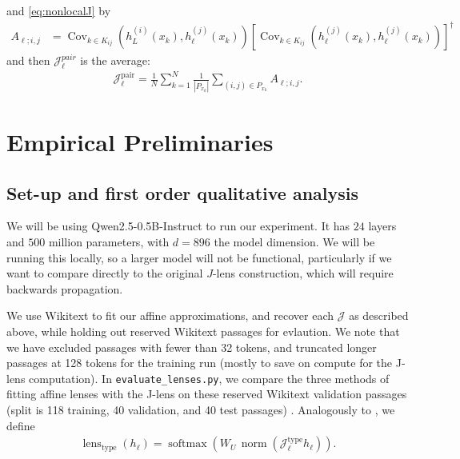 \documentclass[10pt,oneside,reqno]{amsart}
\theoremstyle{definition}
\numberwithin{equation}{section}
\newcommand{\cJ}{{\mathcal{J}}}
\begin{document}
and \eqref{eq:nonlocalJ} by 
\begin{align*}
A_{\ell;i,j}
&=
\operatorname{Cov}_{k\in K_{ij}}
\left(h_L^{(i)}(x_k),h_\ell^{(j)}(x_k)\right)
\left[
\operatorname{Cov}_{k\in K_{ij}}
\left(h_\ell^{(j)}(x_k),h_\ell^{(j)}(x_k)\right)
\right]^\dagger
\end{align*}
and then $\cJ_\ell^{pair}$ is the average:
\begin{align*}
\mathcal J_\ell^{\mathrm{pair}}
=
\frac1N\sum_{k=1}^N
\frac1{|P_{x_k}|}
\sum_{(i,j)\in P_{x_k}}A_{\ell;i,j}.
\end{align*}






\section{Empirical Preliminaries}
\subsection{Set-up and first order qualitative analysis}
We will be using Qwen2.5-0.5B-Instruct to run our experiment. It has $24$ layers and $500$ million parameters, with $d=896$ the model dimension. We will be running this locally, so a larger model will not be functional, particularly if we want to compare directly to the original $J$-lens construction, which will require backwards propagation.

We use Wikitext to fit our affine approximations, and recover each $\mathcal J$ as described above, while holding out reserved Wikitext passages for evlaution. We note that we have excluded passages with fewer than 32 tokens, and truncated longer passages at 128 tokens for the training run (mostly to save on compute for the J-lens computation). In \verb|evaluate_lenses.py|, we compare the three methods of fitting affine lenses with the J-lens on these reserved Wikitext validation passages (split is 118 training, 40 validation, and 40 test passages) . Analogously to \cite{gurnee2026jspace}, we define 
\begin{align*}
\operatorname{lens}_{\mathrm{type}}(h_\ell)
=
\operatorname{softmax}\!\left(
W_U\,\operatorname{norm}
\!\left(\mathcal J_\ell^{\mathrm{type}}h_\ell\right)
\right).
\end{align*}
\end{document}
